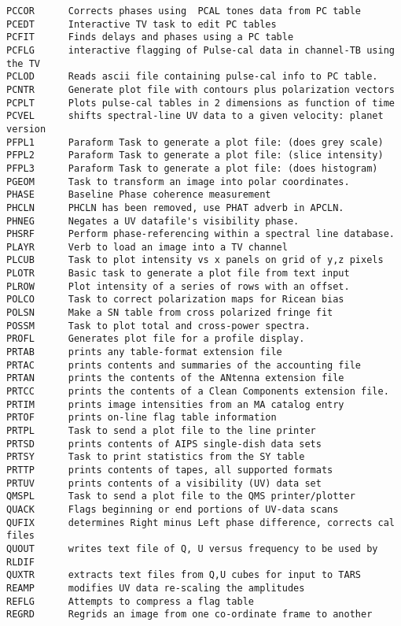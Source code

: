 \begin{verbatim}
PCCOR      Corrects phases using  PCAL tones data from PC table
PCEDT      Interactive TV task to edit PC tables
PCFIT      Finds delays and phases using a PC table
PCFLG      interactive flagging of Pulse-cal data in channel-TB using the TV
PCLOD      Reads ascii file containing pulse-cal info to PC table.
PCNTR      Generate plot file with contours plus polarization vectors
PCPLT      Plots pulse-cal tables in 2 dimensions as function of time
PCVEL      shifts spectral-line UV data to a given velocity: planet version
PFPL1      Paraform Task to generate a plot file: (does grey scale)
PFPL2      Paraform Task to generate a plot file: (slice intensity)
PFPL3      Paraform Task to generate a plot file: (does histogram)
PGEOM      Task to transform an image into polar coordinates.
PHASE      Baseline Phase coherence measurement
PHCLN      PHCLN has been removed, use PHAT adverb in APCLN.
PHNEG      Negates a UV datafile's visibility phase.
PHSRF      Perform phase-referencing within a spectral line database.
PLAYR      Verb to load an image into a TV channel
PLCUB      Task to plot intensity vs x panels on grid of y,z pixels
PLOTR      Basic task to generate a plot file from text input
PLROW      Plot intensity of a series of rows with an offset.
POLCO      Task to correct polarization maps for Ricean bias
POLSN      Make a SN table from cross polarized fringe fit
POSSM      Task to plot total and cross-power spectra.
PROFL      Generates plot file for a profile display.
PRTAB      prints any table-format extension file
PRTAC      prints contents and summaries of the accounting file
PRTAN      prints the contents of the ANtenna extension file
PRTCC      prints the contents of a Clean Components extension file.
PRTIM      prints image intensities from an MA catalog entry
PRTOF      prints on-line flag table information
PRTPL      Task to send a plot file to the line printer
PRTSD      prints contents of AIPS single-dish data sets
PRTSY      Task to print statistics from the SY table
PRTTP      prints contents of tapes, all supported formats
PRTUV      prints contents of a visibility (UV) data set
QMSPL      Task to send a plot file to the QMS printer/plotter
QUACK      Flags beginning or end portions of UV-data scans
QUFIX      determines Right minus Left phase difference, corrects cal files
QUOUT      writes text file of Q, U versus frequency to be used by RLDIF
QUXTR      extracts text files from Q,U cubes for input to TARS
REAMP      modifies UV data re-scaling the amplitudes
REFLG      Attempts to compress a flag table
REGRD      Regrids an image from one co-ordinate frame to another

\end{verbatim}
